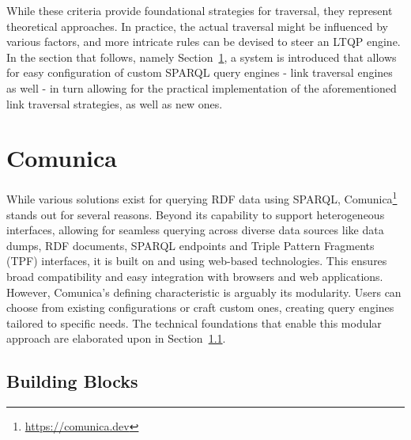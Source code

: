While these criteria provide foundational strategies for traversal, they represent theoretical approaches. In practice, the actual traversal might be influenced by various factors, and more intricate rules can be devised to steer an LTQP engine. In the section that follows, namely Section~\ref{sec:comunica}, a system is introduced that allows for easy configuration of custom SPARQL query engines - link traversal engines as well - in turn allowing for the practical implementation of the aforementioned link traversal strategies, as well as new ones.

\section{Comunica}
\label{sec:comunica}

While various solutions exist for querying RDF data using SPARQL, Comunica\footnote{\url{https://comunica.dev}} stands out for several reasons. Beyond its capability to support heterogeneous interfaces, allowing for seamless querying across diverse data sources like data dumps, RDF documents, SPARQL endpoints and Triple Pattern Fragments (TPF) interfaces, it is built on and using web-based technologies. This ensures broad compatibility and easy integration with browsers and web applications. However, Comunica's defining characteristic is arguably its modularity. Users can choose from existing configurations or craft custom ones, creating query engines tailored to specific needs. The technical foundations that enable this modular approach are elaborated upon in Section~\ref{subsec:comunica_building_blocks}. \citep{taelman2018comunica}

\subsection{Building Blocks}
\label{subsec:comunica_building_blocks}

